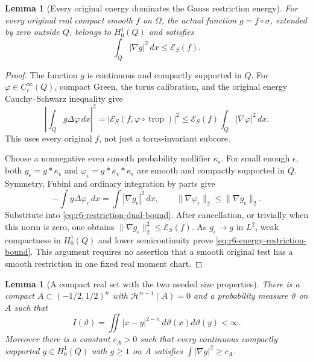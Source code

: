\documentclass[11pt,a4paper]{article}
\numberwithin{equation}{section}
\newtheorem{lemma}[theorem]{Lemma}
\theoremstyle{definition}
\theoremstyle{remark}
\begin{document}
\begin{lemma}[Every original energy dominates the Gauss restriction energy]
\label{lem:r6-energy-gauss-restriction}
For every original real compact smooth $f$ on $\Omega$, the actual
function $g=f\circ\sigma$, extended by zero outside $Q$, belongs to
$H_0^1(Q)$ and satisfies
\begin{equation}
                         \int_Q|\nabla g|^2\,dx\le\mathcal E_S(f).
 \label{eq:r6-energy-restriction-bound}
\end{equation}
\end{lemma}

\begin{proof}
The function $g$ is continuous and compactly supported in $Q$.
For $\varphi\in C_c^\infty(Q)$, compact Green, the torus
calibration, and the original energy Cauchy--Schwarz inequality give
\begin{equation}
 \left|\int_Qg\Delta\varphi\,dx\right|^2
   =|\mathcal E_S(f,\varphi\circ\operatorname{trop})|^2
   \le\mathcal E_S(f)\int_Q|\nabla\varphi|^2\,dx.
 \label{eq:r6-restriction-dual-bound}
\end{equation}
This uses every original $f$, not just a torus-invariant subcore.

Choose a nonnegative even smooth probability mollifier $\kappa_\epsilon$.
For small enough $\epsilon$, both
$g_\epsilon=g*\kappa_\epsilon$ and
$\varphi_\epsilon=g*\kappa_\epsilon*\kappa_\epsilon$ are smooth
and compactly supported in $Q$. Symmetry, Fubini and ordinary
integration by parts give
\[
 -\int g\Delta\varphi_\epsilon\,dx
        =\int|\nabla g_\epsilon|^2\,dx,
 \qquad
 \|\nabla\varphi_\epsilon\|_2
        \le\|\nabla g_\epsilon\|_2.
\]
Substitute into \eqref{eq:r6-restriction-dual-bound}. After cancellation,
or trivially when this norm is zero, one obtains
$\|\nabla g_\epsilon\|_2^2\le\mathcal E_S(f)$.
As $g_\epsilon\to g$ in $L^2$, weak compactness in $H_0^1(Q)$
and lower semicontinuity prove
\eqref{eq:r6-energy-restriction-bound}.
This argument requires no assertion that a smooth original test has
a smooth restriction in one fixed real moment chart.
\end{proof}

\begin{lemma}[A compact real set with the two needed size properties]
\label{lem:r6-cantor-newton-set}
There is a compact $A\subset(-1/2,1/2)^n$ with
$\mathcal H^{n-1}(A)=0$ and a probability measure $\vartheta$
on $A$ such that
\[
                  I(\vartheta)=\iint|x-y|^{2-n}
                                  \,d\vartheta(x)d\vartheta(y)<\infty.
\]
Moreover there is a constant $c_A>0$ such that every continuous
compactly supported $g\in H_0^1(Q)$ with $g\ge1$ on $A$ satisfies
$\int|\nabla g|^2\ge c_A$.
\end{lemma}
\end{document}
